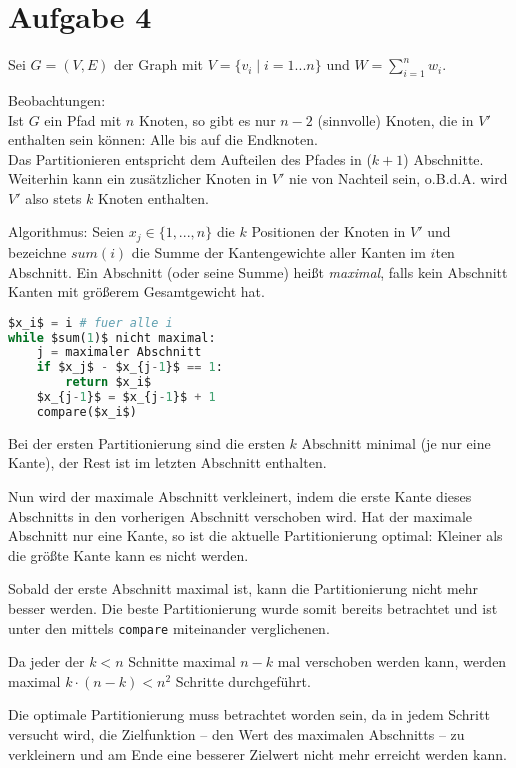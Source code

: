 \documentclass[a4paper]{article}
\begin{document}
\section{Aufgabe 4}

Sei $G = (V, E)$ der Graph mit $V = \{ v_i \mid i = 1 ... n \}$ und 
$W = \sum_{i = 1}^n w_i$.

Beobachtungen: \\
Ist $G$ ein Pfad mit $n$ Knoten, so gibt es nur $n-2$
(sinnvolle) Knoten, die in $V'$ enthalten sein können: Alle bis auf die
Endknoten. \\
Das Partitionieren entspricht dem Aufteilen des Pfades in ($k+1$) Abschnitte. \\
Weiterhin kann ein zusätzlicher Knoten in $V'$ nie von Nachteil
sein, o.B.d.A. wird $V'$ also stets $k$ Knoten enthalten.

Algorithmus:
Seien $x_j \in \{ 1, ..., n \}$ die $k$ Positionen der Knoten in $V'$ und
bezeichne $sum(i)$ die Summe der Kantengewichte aller Kanten im $i$ten
Abschnitt. Ein Abschnitt (oder seine Summe) heißt \emph{maximal}, falls kein
Abschnitt Kanten mit größerem Gesamtgewicht hat.

\begin{lstlisting}[language=Python]
$x_i$ = i # fuer alle i
while $sum(1)$ nicht maximal:
	j = maximaler Abschnitt
	if $x_j$ - $x_{j-1}$ == 1:
		return $x_i$
	$x_{j-1}$ = $x_{j-1}$ + 1
	compare($x_i$)
\end{lstlisting}

Bei der ersten Partitionierung sind die ersten $k$ Abschnitt minimal (je nur
eine Kante), der Rest ist im letzten Abschnitt enthalten.

Nun wird der maximale Abschnitt verkleinert, indem die erste Kante dieses
Abschnitts in den vorherigen Abschnitt verschoben wird.
Hat der maximale Abschnitt nur eine Kante, so ist die aktuelle
Partitionierung optimal: Kleiner als die größte Kante kann es nicht werden.

Sobald der erste Abschnitt maximal ist, kann die Partitionierung nicht mehr
besser werden. Die beste Partitionierung wurde somit bereits betrachtet und
ist unter den mittels \texttt{compare} miteinander verglichenen.

Da jeder der $k < n$ Schnitte maximal $n-k$ mal verschoben werden kann,
werden maximal $k \cdot (n-k) < n^2$ Schritte durchgeführt.

Die optimale Partitionierung muss betrachtet worden sein, da in jedem
Schritt versucht wird, die Zielfunktion -- den Wert des maximalen Abschnitts
-- zu verkleinern und am Ende eine besserer Zielwert nicht mehr erreicht
werden kann.
\end{document}
